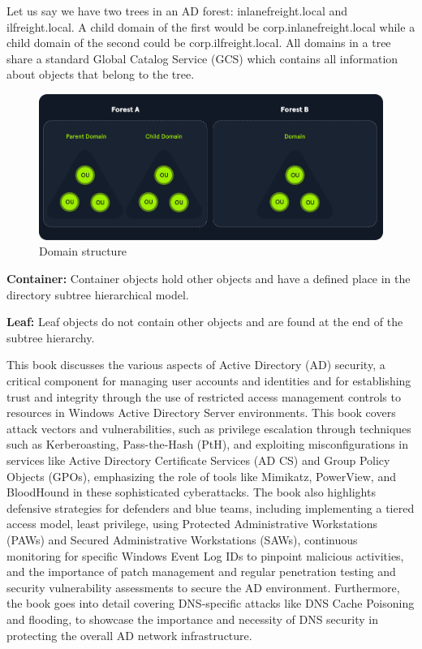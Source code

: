 Let us say we have two trees in an AD forest: inlanefreight.local and ilfreight.local. A child domain of the first would be corp.inlanefreight.local while a child domain of the second could be corp.ilfreight.local. All domains in a tree share a standard Global Catalog Service (GCS) which contains all information about objects that belong to the tree.

\begin{figure}
    \centering
    \includegraphics[width=0.75\linewidth]{domainstructure.png}
    \caption{Domain structure}
\end{figure}

\textbf{Container:}
Container objects hold other objects and have a defined place in the directory subtree hierarchical model.

\textbf{Leaf:}
Leaf objects do not contain other objects and are found at the end of the subtree hierarchy.

This book discusses the various aspects of Active Directory (AD) security, a critical component for managing user accounts and identities and for establishing trust and integrity through the use of restricted access management controls to resources in Windows Active Directory Server environments. This book covers attack vectors and vulnerabilities, such as privilege escalation through techniques such as Kerberoasting, Pass-the-Hash (PtH), and exploiting misconfigurations in services like Active Directory Certificate Services (AD CS) and Group Policy Objects (GPOs), emphasizing the role of tools like Mimikatz, PowerView, and BloodHound in these sophisticated cyberattacks. The book also highlights defensive strategies for defenders and blue teams, including implementing a tiered access model, least privilege, using Protected Administrative Workstations (PAWs) and Secured Administrative Workstations (SAWs), continuous monitoring for specific Windows Event Log IDs to pinpoint malicious activities, and the importance of patch management and regular penetration testing and security vulnerability assessments to secure the AD environment. Furthermore, the book goes into detail covering DNS-specific attacks like DNS Cache Poisoning and flooding, to showcase the importance and necessity of DNS security in protecting the overall AD network infrastructure.


